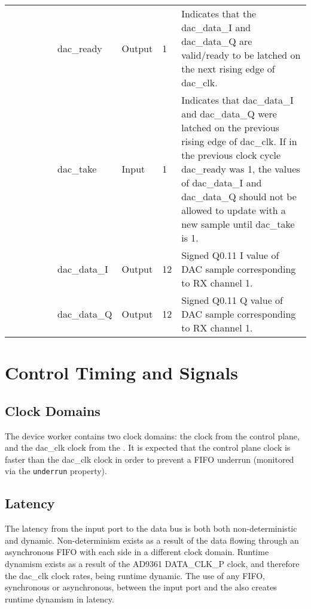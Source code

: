 \begin{landscape}
\begin{scriptsize}
\begin{tabular}{|p{1.75cm}|p{2.25cm}|p{1.25cm}|p{1.25cm}|p{1.25cm}|p{3cm}|p{1.4cm}|p{0.9cm}|p{6.88cm}|}
			&             &        &     &      & dac\_ready   & Output    & 1      & Indicates that the dac\_data\_I and dac\_data\_Q are valid/ready to be latched on the next rising edge of dac\_clk. \\
			\cline{6-9}
			&             &        &     &      & dac\_take    & Input     & 1      & Indicates that dac\_data\_I and dac\_data\_Q were latched on the previous rising edge of dac\_clk. If in the previous clock cycle dac\_ready was 1, the values of dac\_data\_I and dac\_data\_Q should not be allowed to update with a new sample until dac\_take is 1. \\
			\cline{6-9}
			&             &        &     &      & dac\_data\_I & Output    & 12     & Signed Q0.11 I value of DAC sample corresponding to RX channel 1. \\
			\cline{6-9}
			&             &        &     &      & dac\_data\_Q & Output    & 12     & Signed Q0.11 Q value of DAC sample corresponding to RX channel 1. \\
			\hline
		\end{tabular}
	\end{scriptsize}
\end{landscape}

\section*{Control Timing and Signals}
\subsection*{Clock Domains}
The \Comp{} device worker contains two clock domains: the clock from the control plane, and the dac\_clk clock from the \devsignal{}. It is expected that the control plane clock is faster than the dac\_clk clock in order to prevent a FIFO underrun (monitored via the \verb+underrun+ property).
\subsection*{Latency}
The latency from the input port to the \devsignal{} data bus is both both non-deterministic and dynamic. Non-determinism exists as a result of the data flowing through an asynchronous FIFO with each side in a different clock domain. Runtime dynamism exists as a result of the AD9361 DATA\_CLK\_P clock, and therefore the dac\_clk clock rates, being runtime dynamic. The use of any FIFO, synchronous or asynchronous, between the input port and the \devsignal{} also creates runtime dynamism in latency.
